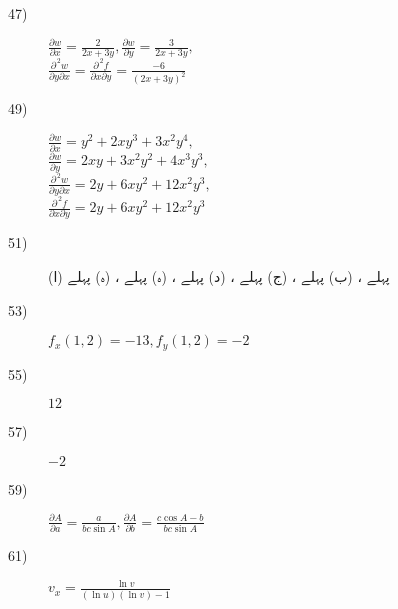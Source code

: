 \begin {description}
\item [
47)
]
 $\tfrac {\partial w}{\partial x}=\tfrac {2}{2x+3y},\tfrac {\partial w}{\partial y}=\tfrac {3}{2x+3y},$\\ $\frac {\partial ^{\,2} w}{\partial y\partial x}=\frac {\partial ^{\,2} f}{\partial x\partial y}=\tfrac {-6}{(2x+3y)^2}$ 
\item [
49)
]
 $\tfrac {\partial w}{\partial x}=y^2+2xy^3+3x^2y^4,$\\ $\tfrac {\partial w}{\partial y}=2xy+3x^2y^2+4x^3y^3,$\\ $\frac {\partial ^{\,2} w}{\partial y\partial x}=2y+6xy^2+12x^2y^3,$\\ $\frac {\partial ^{\,2} f}{\partial x\partial y}=2y+6xy^2+12x^2y^3$ 
\item [
51)
]
 (ا) پہلے ، (ب) پہلے ، (ج) پہلے ، (د) پہلے ، (ہ) پہلے ، (ہ) پہلے  
\item [
53)
]
 $f_x(1,2)=-13, f_y(1,2)=-2$ 
\item [
55)
]
 $12$ 
\item [
57)
]
 $-2$ 
\item [
59)
]
 $\tfrac {\partial A}{\partial a}=\tfrac {a}{bc\sin A},\tfrac {\partial A}{\partial b}=\tfrac {c\cos A-b}{bc\sin A}$ 
\item [
61)
]
 $v_x=\tfrac {\ln v}{(\ln u)(\ln v)-1}$ 
\end {description}

